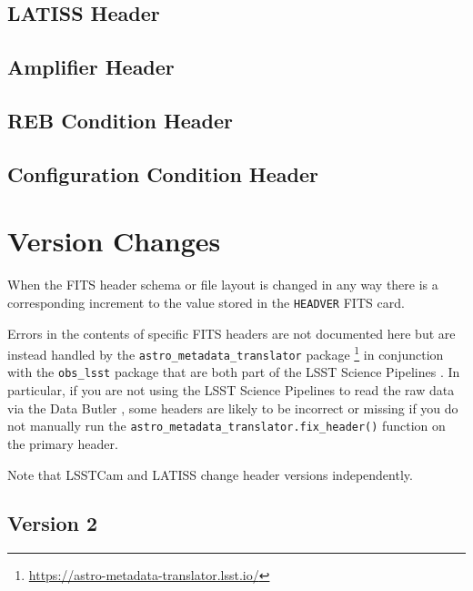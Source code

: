 \documentclass[OPS,lsstdraft,authoryear,toc]{lsstdoc}
\begin{document}


\subsection{LATISS Header}



\subsection{Amplifier Header}



\subsection{REB Condition Header}



\subsection{Configuration Condition Header}



\appendix

\section{Version Changes}
\label{app:headver}

When the FITS header schema or file layout is changed in any way there is a corresponding increment to the value stored in the \texttt{HEADVER} FITS card.

Errors in the contents of specific FITS headers are not documented here but are instead handled by the \texttt{astro\_metadata\_translator} package \footnote{\url{https://astro-metadata-translator.lsst.io/}} in conjunction with the \texttt{obs\_lsst} package that are both part of the LSST Science Pipelines .
In particular, if you are not using the LSST Science Pipelines to read the raw data via the Data Butler \citep{2022SPIE12189E..11J}, some headers are likely to be incorrect or missing if you do not manually run the \texttt{astro\_metadata\_translator.fix\_header()} function on the primary header.

Note that LSSTCam and LATISS change header versions independently.

\subsection{Version 2}
\end{document}
